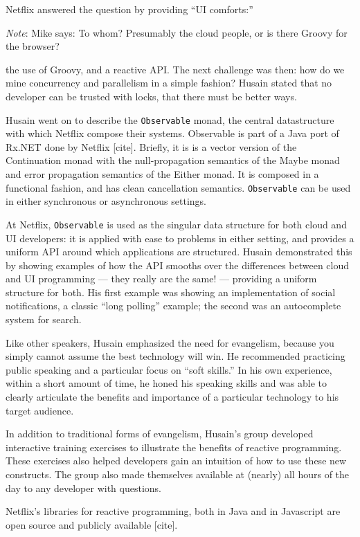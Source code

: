 \documentclass{jfp1}
\newenvironment{ipar}[0]%
 {\begin{list}{}%
 {\setlength{\leftmargin}{1cm}}%
\item[]%
 }
 {\end{list}}
\newcommand\needcite{{\color{red} [cite]}\xspace}
\newcommand{\note}[1]{ \begin{ipar}  {\color{Gray} \textit{Note}: #1} \end{ipar}}
\begin{document}
Netflix answered the question by providing ``UI comforts:'' \note{Mike
  says: To whom?  Presumably the cloud people, or is there Groovy for
  the browser?}  the use of
Groovy, and a reactive API. The next challenge was then: how do
we mine concurrency and parallelism in a simple fashion? Husain stated
that no developer can be trusted with locks, that there must be better
ways.

Husain went on to describe the \texttt{Observable} monad, the central
datastructure with which Netflix compose their systems. Observable is
part of a Java port of Rx.NET done by Netflix\needcite. Briefly, it is is a vector version of
the Continuation monad with the null-propagation semantics of the
Maybe monad and error propagation semantics of the Either monad. It
is composed in a functional fashion, and has clean cancellation
semantics. \texttt{Observable} can be used in either synchronous or
asynchronous settings.

At Netflix, \texttt{Observable} is used as the singular data structure
for both cloud and UI developers: it is applied with ease to problems
in either setting, and provides a uniform API around which
applications are structured. Husain demonstrated this by showing
examples of how the API smooths over the differences between cloud
and UI programming --- they really are the same! --- providing a
uniform structure for both. His first example was showing an
implementation of social notifications, a classic ``long polling''
example; the second was an autocomplete system for search.

Like other speakers, Husain emphasized the need for evangelism,
because you simply cannot assume the best technology will win.
He recommended practicing public speaking and a particular focus
on ``soft skills.'' In his own experience, within a short amount of time,
he honed his speaking skills and was able to clearly articulate the
benefits and importance of a particular technology to his target 
audience.

In addition to traditional forms of evangelism, Husain's group
developed interactive training exercises to illustrate the benefits
of reactive programming. These exercises also helped developers gain
an intuition of how to use these new constructs. The group  also made
themselves available at (nearly) all hours of the day to any developer
with questions.

Netflix's libraries for reactive programming, both in Java and in 
Javascript are open source and publicly available\needcite.
\end{document}
